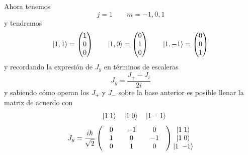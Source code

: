 \documentclass[10pt,oneside]{CBFT_book}
\begin{document}
Ahora tenemos 
\[
	j=1 \qquad m = -1,0,1
\]
y tendremos
\[
	\Ket{1,1} = \begin{pmatrix}
	 1 \\
	 0 \\
	 0
	\end{pmatrix}
	\qquad 
	\Ket{1,0} = \begin{pmatrix}
	 0 \\
	 1 \\
	 0
	\end{pmatrix}
	\qquad 
	\Ket{1,-1} = \begin{pmatrix}
	 0 \\
	 0 \\
	 1
	\end{pmatrix}
\]
y recordando la expresión de $J_y$ en términos de escaleras
\[
	J_y = \frac{J_+ - J_i}{2i}
\]
y sabiendo cómo operan los $J_+$ y $J_-$ sobre la base anterior es posible
llenar la matriz de acuerdo con
\[
	\begin{matrix} \quad \Ket{1\;1} \quad \Ket{1\;0} \quad \Ket{1\;-\kern-1mm 1} \end{matrix}
\]
\[
	J_y = \frac{i\hbar}{\sqrt{2}} \begin{pmatrix}
	                               \quad 0 & \quad -1 \quad & 0 \quad \\
	                               \quad 1 & \quad 0 \quad & -1 \quad \\
	                               \quad 0 & \quad 1 \quad & 0 \quad
	                              \end{pmatrix} 
	     \begin{matrix}  \Ket{1\;1} \\ \Ket{1\;0} \\ \Ket{1\;-\kern-1mm 1} \end{matrix}
\]
\end{document}
